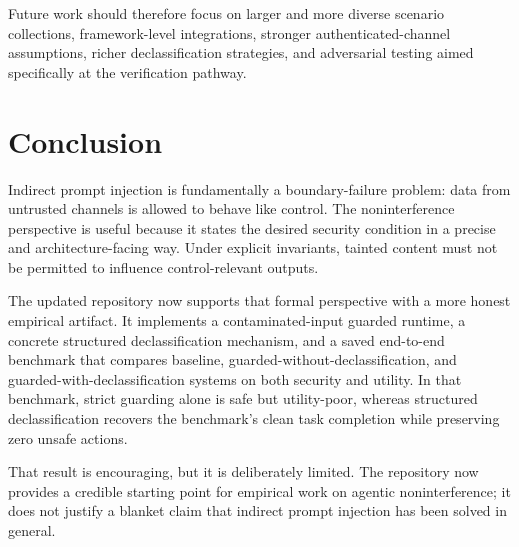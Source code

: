 \documentclass[11pt]{article}
\begin{document}
Future work should therefore focus on larger and more diverse scenario
collections, framework-level integrations, stronger authenticated-channel
assumptions, richer declassification strategies, and adversarial testing aimed
specifically at the verification pathway.

\section{Conclusion}\label{sec:conclusion}

Indirect prompt injection is fundamentally a boundary-failure problem: data from
untrusted channels is allowed to behave like control. The noninterference
perspective is useful because it states the desired security condition in a
precise and architecture-facing way. Under explicit invariants, tainted content
must not be permitted to influence control-relevant outputs.

The updated repository now supports that formal perspective with a more honest
empirical artifact. It implements a contaminated-input guarded runtime, a
concrete structured declassification mechanism, and a saved end-to-end
benchmark that compares baseline, guarded-without-declassification, and
guarded-with-declassification systems on both security and utility. In that
benchmark, strict guarding alone is safe but utility-poor, whereas structured
declassification recovers the benchmark's clean task completion while
preserving zero unsafe actions.

That result is encouraging, but it is deliberately limited. The repository now
provides a credible starting point for empirical work on agentic noninterference;
it does not justify a blanket claim that indirect prompt injection has been
solved in general.



\end{document}
